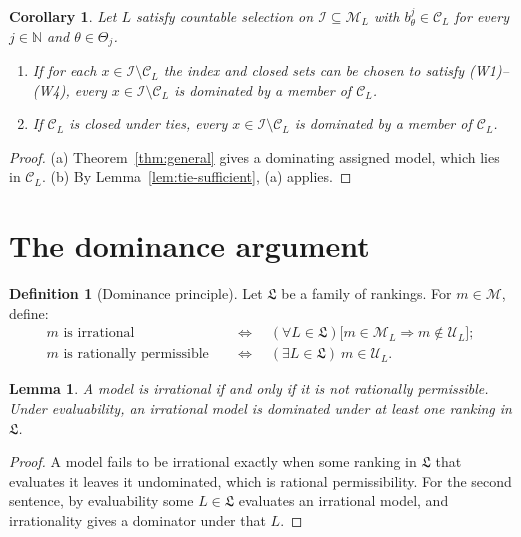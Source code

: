 \documentclass[11pt]{article}
\newtheorem{lemma}[theorem]{Lemma}
\newtheorem{corollary}[theorem]{Corollary}
\theoremstyle{definition}
\newtheorem{definition}[theorem]{Definition}
\theoremstyle{remark}
\newcommand{\M}{\mathcal M}
\newcommand{\C}{\mathcal C}
\newcommand{\I}{\mathcal I}
\newcommand{\U}{\mathcal U}
\newcommand{\Lf}{\mathfrak L}
\begin{document}
\begin{corollary}\label{cor:coherent-assigned}
Let $L$ satisfy countable selection on $\I\subseteq\M_L$ with $b^j_\theta\in\C_L$ for every $j\in\mathbb N$ and $\theta\in\Theta_j$.
\begin{enumerate}[label=(\alph*)]
\item If for each $x\in\I\setminus\C_L$ the index and closed sets can be chosen to satisfy (W1)--(W4), every $x\in\I\setminus\C_L$ is dominated by a member of $\C_L$.
\item If $\C_L$ is closed under ties, every $x\in\I\setminus\C_L$ is dominated by a member of $\C_L$.
\end{enumerate}
\end{corollary}
\begin{proof}
(a) Theorem~\ref{thm:general} gives a dominating assigned model, which lies in $\C_L$. (b) By Lemma~\ref{lem:tie-sufficient}, (a) applies.
\end{proof}

\section{The dominance argument}\label{sec:conclusion}

\begin{definition}[Dominance principle]\label{def:permissibility}
Let $\Lf$ be a family of rankings. For $m\in\M$, define:
\begin{align*}
m\text{ is irrational}&\quad\Longleftrightarrow\quad (\forall L\in\Lf)\bigl[m\in\M_L\Rightarrow m\notin\U_L\bigr];\\
m\text{ is rationally permissible}&\quad\Longleftrightarrow\quad (\exists L\in\Lf)\ m\in\U_L.
\end{align*}
\end{definition}

\begin{lemma}\label{lem:complement}
A model is irrational if and only if it is not rationally permissible. Under evaluability, an irrational model is dominated under at least one ranking in $\Lf$.
\end{lemma}
\begin{proof}
A model fails to be irrational exactly when some ranking in $\Lf$ that evaluates it leaves it undominated, which is rational permissibility. For the second sentence, by evaluability some $L\in\Lf$ evaluates an irrational model, and irrationality gives a dominator under that $L$.
\end{proof}
\end{document}
